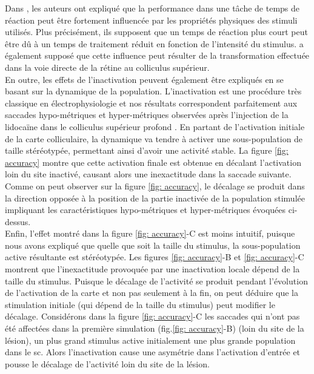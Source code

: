 Dans \cite {Bell:2006}, les auteurs ont expliqué que la performance dans une tâche de temps de réaction peut être fortement influencée par les propriétés physiques des stimuli utilisés. Plus précisément, ils supposent que un temps de réaction plus court peut être dû à un temps de traitement réduit en fonction de l'intensité du stimulus. \cite {Jaskowki:2004} a également supposé que cette influence peut résulter de la transformation effectuée dans la voie directe de la rétine au colliculus supérieur. \\

En outre, les effets de l'inactivation peuvent également être expliqués en se basant sur la dynamique de la population. L'inactivation est une procédure très classique en électrophysiologie et nos résultats correspondent parfaitement aux saccades hypo-métriques et hyper-métriques observées après l'injection de la lidocaïne dans le colliculus supérieur profond \cite{Lee:1988}. En partant de l'activation initiale de la carte colliculaire, la dynamique va tendre à activer une sous-population de taille stéréotypée, permettant ainsi d'avoir une activité stable. La figure \ref{fig: accuracy} montre que cette activation finale est obtenue en décalant l'activation loin du site inactivé, causant alors une inexactitude dans la saccade suivante. Comme on peut observer sur la figure \ref{fig: accuracy}, le décalage se produit dans la direction opposée à la position de la partie inactivée de la population stimulée impliquant les caractéristiques hypo-métriques et hyper-métriques évoquées ci-dessus. \\

Enfin, l'effet montré dans la figure \ref{fig: accuracy}-C est moins intuitif, puisque nous avons expliqué que quelle que soit la taille du stimulus, la sous-population active résultante est stéréotypée. Les figures \ref{fig: accuracy}-B et \ref{fig: accuracy}-C montrent que l'inexactitude provoquée par une inactivation locale dépend de la taille du stimulus. Puisque le décalage de l'activité se produit pendant l'évolution de l'activation de la carte et non pas seulement à la fin, on peut déduire que la stimulation initiale (qui dépend de la taille du stimulus) peut modifier le décalage. Considérons dans la figure \ref{fig: accuracy}-C les saccades qui n'ont pas été affectées dans la première simulation (fig.\ref{fig: accuracy}-B) (loin du site de la lésion), un plus grand stimulus active initialement une plus grande population dans le \gls{sc}. Alors l'inactivation cause une asymétrie dans l'activation d'entrée et pousse le décalage de l'activité loin du site de la lésion.


